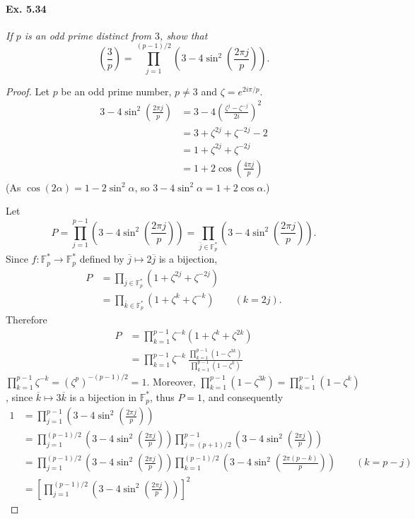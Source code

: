 \documentclass[11pt,a4paper]{article}
\newcommand{\F}{\mathbb{F}}
\newcommand{\legendre}[2]{\genfrac{(}{)}{}{}{#1}{#2}}
\begin{document}
\paragraph{Ex. 5.34}

{\it If $p$ is an odd prime distinct from $3$, show that 
$$\legendre{3}{p} = \prod_{j=1}^{(p-1)/2} \left(3-4 \sin^2\left(\frac{2 \pi j}{p}\right)\right).$$
}

\begin{proof}
Let $p$ be an odd prime number, $p\ne 3$ and $\zeta= e^{2i\pi/p}$.
\begin{align*}
3 - 4 \sin^2\left(\frac{2\pi j}{p}\right) &= 3 - 4  \left( \frac{\zeta^j - \zeta^{-j}}{2i}\right)^2\\
&= 3 + \zeta^{2j} + \zeta^{-2j} - 2\\
&= 1 +\zeta^{2j} + \zeta^{-2j}\\
&= 1 + 2 \cos \left(\frac{4\pi j}{p} \right)
\end{align*}
(As $\cos(2\alpha) = 1 - 2 \sin^2\alpha$, so $3 - 4 \sin^2 \alpha = 1 + 2 \cos \alpha$.)

Let $$P = \prod_{j=1}^{p-1} \left(3-4 \sin^2\left(\frac{2 \pi j}{p}\right)\right) =  \prod_{\overline{j} \in \F_p^*} \left(3-4 \sin^2\left(\frac{2 \pi j}{p}\right)\right).$$
Since $f : \F_p^* \to \F_p^*$ defined by $\overline{j} \mapsto 2\overline{j}$ is a bijection,
\begin{align*}
P  &= \prod_{\overline{j} \in \F_p^*} \left(1 + \zeta^{2 j}+ \zeta^{-2j}\right)\\
&= \prod_{\overline{k} \in \F_p^*} \left(1 + \zeta^{k}+ \zeta^{-k}\right)\qquad (k = 2j).
\end{align*}
Therefore
\begin{align*}
P &=  \prod_{k=1}^{p-1} \zeta^{-k}\left(1 + \zeta^k + \zeta^{2k} \right)\\
&=  \prod_{k=1}^{p-1} \zeta^{-k} \  \frac{\prod_{k=1}^{p-1} (1 - \zeta^{3k})}{\prod_{k=1}^{p-1} (1 - \zeta^{k})}
\end{align*}
$\prod_{k=1}^{p-1} \zeta^{-k} =\left( \zeta^p\right)^{-(p-1)/2} = 1$. Moreover, $\prod_{k=1}^{p-1} (1 - \zeta^{3k}) = \prod_{k=1}^{p-1} (1 - \zeta^{k})$, since $\overline{k} \mapsto 3 \overline{k}$ is a bijection in $\F_p^*$, thus $P = 1$, and consequently
\begin{align*}
1 &= \prod_{j=1}^{p-1}  \left(3-4 \sin^2\left(\frac{2 \pi j}{p}\right)\right)\\
&=\prod_{j=1}^{(p-1)/2}  \left(3-4 \sin^2\left(\frac{2 \pi j}{p}\right)\right) \prod_{j=(p+1)/2}^{p-1}  \left(3-4 \sin^2\left(\frac{2 \pi j}{p}\right)\right)\\
&= \prod_{j=1}^{(p-1)/2}  \left(3-4 \sin^2\left(\frac{2 \pi j}{p}\right)\right)  \prod_{k=1}^{(p-1)/2}  \left(3-4 \sin^2\left(\frac{2 \pi (p-k)}{p}\right)\right) \qquad (k=p-j)\\
&=\left [ \prod_{j=1}^{(p-1)/2}  \left(3-4 \sin^2\left(\frac{2 \pi j}{p}\right)\right)\right]^2
\end{align*}


\end{proof}
\end{document}
